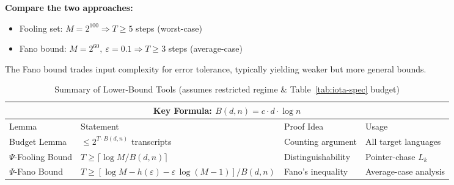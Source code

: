 \begin{remark}
\par\smallskip
\begin{center}
\end{center}

\noindent\begin{minipage}{0.96\textwidth}
\textbf{Compare the two approaches:}
\begin{itemize}[leftmargin=1.2em]
\item Fooling set: $M = 2^{100} \Rightarrow T \ge 5$ steps (worst-case)
\item Fano bound: $M = 2^{60},\ \varepsilon = 0.1 \Rightarrow T \ge 3$ steps (average-case)
\end{itemize}
The Fano bound trades input complexity for error tolerance, typically yielding weaker but more general bounds.
\end{minipage}
\end{remark}

\begin{table}[h]
\centering
\caption{Summary of Lower-Bound Tools (assumes restricted regime \& Table~\ref{tab:iota-spec} budget)}
\label{tab:lower-bound-summary}
\small
\begin{tabular}{@{}p{2.5cm}p{5.5cm}p{3cm}p{3.5cm}@{}}
\toprule
\multicolumn{4}{c}{\textbf{Key Formula: } $B(d,n) = c \cdot d \cdot \log n$} \\
\midrule
Lemma & Statement & Proof Idea & Usage \\
\midrule
Budget Lemma & $\leq 2^{T \cdot B(d,n)}$ transcripts & Counting argument & All target languages \\
$\Psi$-Fooling Bound & $T \geq \lceil \log M / B(d,n) \rceil$ & Distinguishability & Pointer-chase $L_k$ \\
$\Psi$-Fano Bound & $T \geq [\log M - h(\varepsilon) - \varepsilon \, \log(M-1)] / B(d,n)$ & Fano's inequality & Average-case analysis \\
\bottomrule
\end{tabular}
\end{table}

